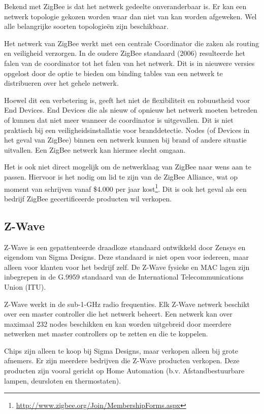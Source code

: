 \documentclass{../local}
\begin{document}
Bekend met ZigBee is dat het netwerk gedeelte onveranderbaar is. Er kan een netwerk topologie gekozen worden waar dan niet van kan worden afgeweken. Wel alle belangrijke soorten topologieën zijn beschikbaar.

Het netwerk van ZigBee werkt met een centrale Coordinator die zaken als routing en veiligheid verzorgen. In de oudere ZigBee standaard (2006) resulteerde het falen van de coordinator tot het falen van het netwerk. Dit is in nieuwere versies opgelost door de optie te bieden om binding tables van een netwerk te distribueren over het gehele netwerk.

Hoewel dit een verbetering is, geeft het niet de flexibiliteit en robuustheid voor End Devices. End Devices die als nieuw of opnieuw het netwerk moeten betreden of kunnen dat niet meer wanneer de coordinator is uitgevallen. Dit is niet praktisch bij een veiligheidsinstallatie voor branddetectie. Nodes (of Devices in het geval van ZigBee) binnen een netwerk kunnen bij brand of andere situatie uitvallen. Een ZigBee netwerk kan hiermee slecht omgaan.

Het is ook niet direct mogelijk om de netwerklaag van ZigBee naar wens aan te passen. Hiervoor is het nodig om lid te zijn van de ZigBee Alliance, wat op moment van schrijven vanaf \$4.000 per jaar kost\footnote{\url{http://www.zigbee.org/Join/MembershipForms.aspx}}. Dit is ook het geval als een bedrijf ZigBee gecertificeerde producten wil verkopen.

\subsection{Z-Wave}
Z-Wave is een gepattenteerde draadloze standaard ontwikkeld door Zensys en eigendom van Sigma Designs. Deze standaard is niet open voor iedereen, maar alleen voor klanten voor het bedrijf zelf. De Z-Wave fysieke en MAC lagen zijn inbegrepen in de G.9959 standaard van de International Telecommunications Union (ITU)\cite{ITUG9959}.

Z-Wave werkt in de sub-1-GHz radio frequenties. Elk Z-Wave netwerk beschikt over een master controller die het netwerk beheert. Een netwerk kan over maximaal 232 nodes beschikken en kan worden uitgebreid door meerdere netwerken met master controllers op te zetten en die te koppelen.

Chips zijn alleen te koop bij Sigma Designs, maar verkopen alleen bij grote afnemers. Er zijn meerdere bedrijven die Z-Wave producten verkopen. Deze producten zijn vooral gericht op Home Automation (b.v. Afstandbestuurbare lampen, deursloten en thermostaten).
\end{document}
